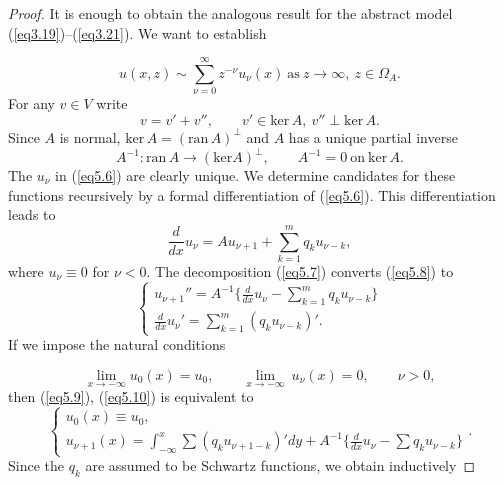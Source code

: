 \documentclass{surv-l}
\theoremstyle{plain}
\theoremstyle{definition}
\numberwithin{equation}{chapter}
\begin{document}
\begin{proof}
It is enough to obtain the analogous result for the abstract model (\ref{eq3.19})--(\ref{eq3.21}). We want to establish

\begin{equation}\label{eq5.6}
u(x,z)\sim\sum_{\nu=0}^{\infty}z^{-\nu}u_{\nu}(x)\ \mathrm{as}\  z\rightarrow\infty,\ z\in\Omega_{A}.
\end{equation}
For any $v\in V$ write
\begin{equation}\label{eq5.7}
v=v'+v'',\qquad v'\in \mathrm{ker}\,A,\ v''\perp \mathrm{ker}\,A.
\end{equation}
Since $A$ is normal, $\mathrm{ker}\,A= (\mathrm{ran}\,A)^{\perp}$ and $A$ has a unique partial inverse
\begin{equation*}
A^{-1} : \mathrm{ran}\, A\rightarrow(\mathrm{ker}A)^{\perp},\qquad A^{-1}=0\ \mathrm{on}\ \mathrm{ker}\,A.
\end{equation*}
The $u_{\nu}$ in (\ref{eq5.6}) are clearly unique. We determine candidates for these functions recursively by a formal differentiation of (\ref{eq5.6}). This differentiation leads to
\begin{equation}\label{eq5.8}
\frac{d}{dx}u_{\nu}=Au_{\nu+1}+\sum_{k=1}^{m}q_{k}u_{\nu-k},
\end{equation}
where $u_{\nu}\equiv 0$ for $\nu <0$. The decomposition (\ref{eq5.7}) converts (\ref{eq5.8}) to
\begin{equation}\label{eq5.9}
\left\{\begin{array}{l}
u_{\nu+1}''=A^{-1}\{\frac{d}{dx}u_{\nu}-\sum_{k=1}^{m}q_{k}u_{\nu-k}\}\\
\frac{d}{dx}u_{\nu}'=\sum_{k=1}^{m}(q_{k}u_{\nu-k})'.
\end{array}\right.
\end{equation}
If we impose the natural conditions

\begin{equation}\label{eq5.10}
\lim_{x\rightarrow-\infty} u_{0}(x)=u_{0},\qquad \lim_{x\rightarrow-\infty}\ u_{\nu}(x)=0,\qquad \nu >0,
\end{equation}
then (\ref{eq5.9}), (\ref{eq5.10}) is equivalent to
\begin{equation}\label{eq5.11}
\left\{\begin{array}{l}
u_{0}(x)\equiv u_{0},\\
u_{\nu+1}(x)=\int_{-\infty}^{x}\sum(q_{k}u_{\nu+1-k})'dy+A^{-1}\{\frac{d}{dx}u_{\nu}-\sum q_{k}u_{\nu-k}\}
\end{array}\right..
\end{equation}
Since the $q_{k}$ are assumed to be Schwartz functions, we obtain inductively


\end{proof}
\end{document}
